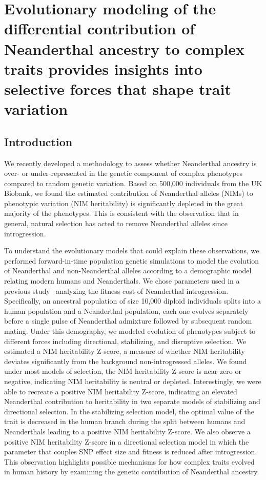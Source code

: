 \chapter{Evolutionary modeling of the differential contribution of Neanderthal ancestry to complex traits provides insights into selective forces that shape trait variation}
\section{Introduction}
We recently developed a methodology to assess whether Neanderthal ancestry is over- or under-represented in the genetic component of complex phenotypes compared to random genetic variation. Based on 500,000 individuals from the UK Biobank, we found the estimated contribution of Neanderthal alleles (NIMs) to phenotypic variation (NIM heritability) is significantly depleted in the great majority of the phenotypes. This is consistent with the observation that in general, natural selection has acted to remove Neanderthal alleles since introgression. 

To understand the evolutionary models that could explain these observations, we performed forward-in-time population genetic simulations to model the evolution of Neanderthal and non-Neanderthal alleles according to a demographic model relating modern humans and Neanderthals. We chose parameters used in a previous study~\cite{petr2019limits} analyzing the fitness cost of Neanderthal introgression. Specifically, an ancestral population of size 10,000 diploid individuals splits into a human population and a Neanderthal population, each one evolves separately before a single pulse of Neanderthal admixture followed by subsequent random mating. Under this demography, we modeled evolution of phenotypes subject to different forces including directional, stabilizing, and disruptive selection. We estimated a NIM heritability Z-score, a measure of whether NIM heritability deviates significantly from the background non-introgressed alleles. We found under most models of selection, the NIM heritability Z-score is near zero or negative, indicating NIM heritability is neutral or depleted. Interestingly, we were able to recreate a positive NIM heritability Z-score, indicating an elevated Neanderthal contribution to heritability in two separate models of stabilizing and directional selection. In the stabilizing selection model, the optimal value of the trait is decreased in the human branch during the split between humans and Neanderthals leading to a positive NIM heritability Z-score. We also observe a positive NIM heritability Z-score in a directional selection model in which the parameter that couples SNP effect size and fitness is reduced after introgression. This observation highlights possible mechanisms for how complex traits evolved in human history by examining the genetic contribution of Neanderthal ancestry.
